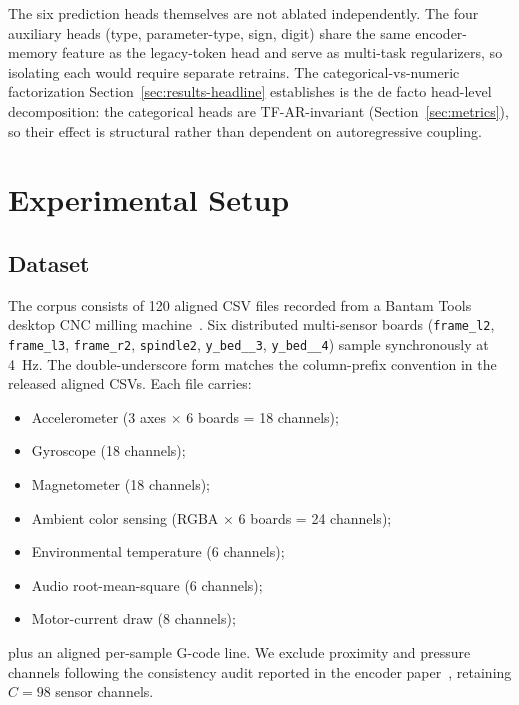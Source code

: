 \documentclass[sensors,article,submit,moreauthors,pdftex]{Definitions/mdpi}
\begin{document}
The six prediction heads themselves are not ablated independently. The four auxiliary heads (type, parameter-type, sign, digit) share the same encoder-memory feature as the legacy-token head and serve as multi-task regularizers, so isolating each would require separate retrains. The categorical-vs-numeric factorization Section~\ref{sec:results-headline} establishes is the de facto head-level decomposition: the categorical heads are TF-AR-invariant (Section~\ref{sec:metrics}), so their effect is structural rather than dependent on autoregressive coupling.

\section{Experimental Setup}
\label{sec:setup}

\subsection{Dataset}
\label{sec:dataset}

The corpus consists of 120 aligned CSV files recorded from a Bantam Tools desktop CNC milling machine~\cite{encoder_paper}. Six distributed multi-sensor boards (\texttt{frame\_l2}, \texttt{frame\_l3}, \texttt{frame\_r2}, \texttt{spindle2}, \texttt{y\_bed\_\_3}, \texttt{y\_bed\_\_4}) sample synchronously at 4~Hz. The double-underscore form matches the column-prefix convention in the released aligned CSVs. Each file carries:
\begin{itemize}
\item Accelerometer (3 axes $\times$ 6 boards = 18 channels);
\item Gyroscope (18 channels);
\item Magnetometer (18 channels);
\item Ambient color sensing (RGBA $\times$ 6 boards = 24 channels);
\item Environmental temperature (6 channels);
\item Audio root-mean-square (6 channels);
\item Motor-current draw (8 channels);
\end{itemize}
plus an aligned per-sample G-code line. We exclude proximity and pressure channels following the consistency audit reported in the encoder paper~\cite{encoder_paper}, retaining $C=98$ sensor channels.
\end{document}
